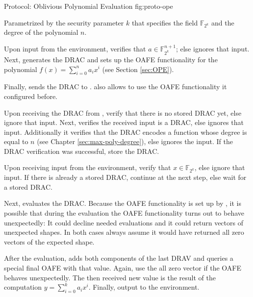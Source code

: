 \begin{JWprotocol}%
  {\JWprotoSymOPE}%
  {Protocol: Oblivious Polynomial Evaluation}%
  {fig:proto-ope}

  Parametrized by the security parameter $k$ that specifies the field
  $\mathbb{F}_{2^k}$ and the degree of the polynomial $n$.


  \begin{JWprotoSteps}

  \item Upon input  from the environment, \JWpOne{}
    verifies that $a \in \mathbb{F}_{2^k}^{n+1}$; else ignores that input. Next,
    \JWpOne{} generates the DRAC and sets up the OAFE functionality for the
    polynomial $f(x) = \sum_{i=0}^n a_ix^i$ (see Section \ref{sec:OPE}).

  \item Finally, \JWpOne{} sends the DRAC to \JWpTwo{}. \JWpOne{} also allows
    \JWpTwo{} to use the OAFE functionality it configured before.

  \end{JWprotoSteps}



  \begin{JWprotoSteps}

  \item Upon receiving the DRAC from \JWpOne{}, verify that there is no stored
    DRAC yet, else ignore that input. Next, \JWpTwo{} verifies the received
    input is a DRAC, else ignores that input. Additionally it verifies
    that the DRAC encodes a function whose degree is equal to $n$ (see
    Chapter \ref{sec:max-poly-degree}), else ignores the input. If the DRAC
    verification was successful, store the DRAC.

  \item Upon receiving input  from the environment,
    verify that $x \in \mathbb{F}_{2^k}$, else ignore that input. If there is
    already a stored DRAC, continue at the next step, else wait for a stored
    DRAC.

  \item Next, \JWpTwo{} evaluates the DRAC. Because the OAFE functionality is
    set up by \JWpOne{}, it is possible that during the evaluation the OAFE
    functionality turns out to behave unexpectedly: It could decline needed
    evaluations and it could return vectors of unexpected shapes. In both cases
    always assume it would have returned all zero vectors of the expected shape.

  \item After the evaluation, \JWpTwo{} adds both components of the last DRAV
    and queries a special final OAFE with that value. Again, use the all zero
    vector if the OAFE behaves unexpectedly. The then received new value is the
    result of the computation $y = \sum_{i=0}^k a_ix^i$. Finally, output
     to the environment.

  \end{JWprotoSteps}

\end{JWprotocol}

